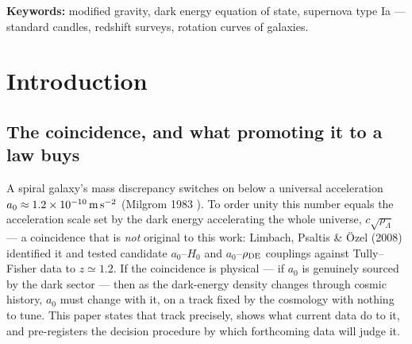 \documentclass[11pt,a4paper]{article}
\newcommand{\Mbar}{M_{\rm bar}}
\newcommand{\rhoDE}{\rho_{\rm DE}}
\newcommand{\azero}{a_0}
\newcommand{\msms}{{\rm m\,s^{-2}}}
\begin{document}
\begin{abstract}
common-mode $\Mbar$ calibration to $\lesssim0.05$ dex (with $\sim$20--40 clean
deep-MOND rotators), and the degeneracy-breaking observable is the
rotation-curve/radial-acceleration-relation transition, not the BTFR zero
point. At present DESI DR2 gives $R(z{=}3)=0.775\,[0.68,0.88]$, a $2.0\sigma$
hint below our committed $3\sigma$ bar --- undecided. We therefore
pre-register --- with a hashed, timestamped estimator, decision thresholds,
and data hierarchy fixed before the data exist --- the test against the
forthcoming Rubin/LSST calibrated supernova cosmology sample (expected
$\gtrsim2027$), which forecasts project to settle the gate at the $3$--$6\sigma$
level by $\sim$2028--2030. The value of $\azero$, the normalization $Z$, and
the sign of the effect are posited, not derived; the kernel
$\nu=\sqrt{1+1/y}$ is Milgrom's (1999) and the covariant MOND-scale
realization is AeST (Skordis \& Zlosnik 2021). The contribution is a bounded,
falsifiable, pre-registered program, not a detection.
\end{abstract}

\medskip
\noindent\textbf{Keywords:} modified gravity, dark energy equation of state,
supernova type Ia --- standard candles, redshift surveys, rotation curves of
galaxies.

\tableofcontents

\section{Introduction}
\label{sec:intro}

\subsection{The coincidence, and what promoting it to a law buys}

A spiral galaxy's mass discrepancy switches on below a universal acceleration
$\azero\approx1.2\times10^{-10}\,\msms$ (Milgrom 1983 \cite{Milgrom1983}). To
order unity this number equals the acceleration scale set by the dark energy
accelerating the whole universe, $c\sqrt{\rho_\Lambda}$ --- a coincidence that
is \emph{not} original to this work: Limbach, Psaltis \& \"Ozel (2008)
\cite{LPO2008} identified it and tested candidate $\azero$--$H_0$ and
$\azero$--$\rhoDE$ couplings against Tully--Fisher data to $z\simeq1.2$. If
the coincidence is physical --- if $\azero$ is genuinely sourced by the dark
sector --- then as the dark-energy density changes through cosmic history,
$\azero$ must change with it, on a track fixed by the cosmology with nothing
to tune. This paper states that track precisely, shows what current data do to
it, and pre-registers the decision procedure by which forthcoming data will
judge it.
\end{document}
